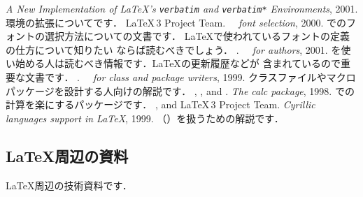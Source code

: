 \begin{myreferences}
  {\em A New Implementation of \LaTeX 's \texttt{verbatim} and
 \texttt{verbatim*} Environments}, 2001. 
 \sanko {}
 \sanko  {}環境の拡張についてです．
%
 {\LaTeX\,3} Project Team. \newblock
  {\em \LaTeXe\ \ font selection}, 2000. 
 \sanko {}
 \sanko {\LaTeX}でのフォントの選択方法についての文書です．
   {\LaTeX}で使われているフォントの定義の仕方について知りたい
   ならば読むべきでしょう．
%
 \iiiemdash. \newblock
  {\em \LaTeXe\ \ for authors}, 2001. 
  \sanko {}
  \sanko {\LaTeX}を使い始める人は読むべき情報です．{\LaTeX}の更新履歴などが
 含まれているので重要な文書です．
%
 \iiiemdash.  \newblock
  \emph{\LaTeXe\ \ for class and package writers}, 1999.
   \sanko {}
   \sanko クラスファイルやマクロパッケージを設計する人向けの解説です．
%
 , , and
 . \newblock
  {\em The {calc} package}, 1998. 
  \sanko {}
  \sanko {\LaTeX}での計算を楽にするパッケージです．
%
%
  ,  and 
  {\LaTeX\,3 Project Team}.  \newblock
  \emph{Cyrillic languages support in {\LaTeX}}, 1999.
  \sanko {}
  \sanko {}（）を扱うための解説です．
%
\end{myreferences}


\subsection{\LaTeX 周辺の資料}

 \LaTeX 周辺の技術資料です．

